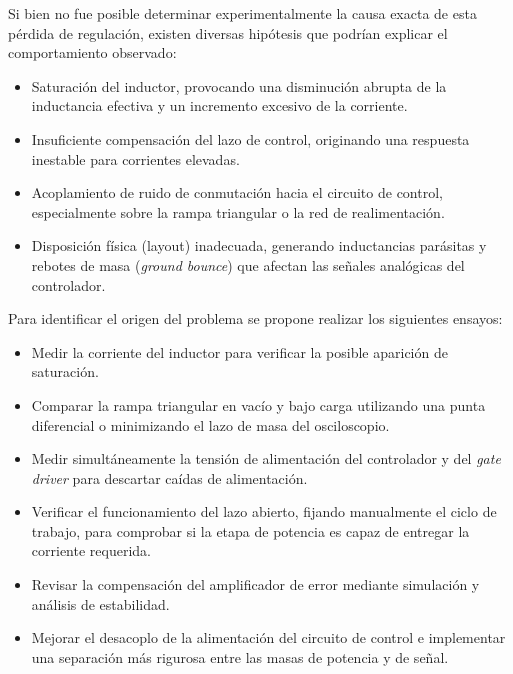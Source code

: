 \documentclass[]{article}
\begin{document}
	Si bien no fue posible determinar experimentalmente la causa exacta de esta pérdida de regulación, existen diversas hipótesis que podrían explicar el comportamiento observado:
	
	\begin{itemize}
		\item Saturación del inductor, provocando una disminución abrupta de la inductancia efectiva y un incremento excesivo de la corriente.
		
		\item Insuficiente compensación del lazo de control, originando una respuesta inestable para corrientes elevadas.
		
		\item Acoplamiento de ruido de conmutación hacia el circuito de control, especialmente sobre la rampa triangular o la red de realimentación.
		
		\item Disposición física (layout) inadecuada, generando inductancias parásitas y rebotes de masa (\textit{ground bounce}) que afectan las señales analógicas del controlador.
		
		
	\end{itemize}
	
	Para identificar el origen del problema se propone realizar los siguientes ensayos:
	
	\begin{itemize}
		\item Medir la corriente del inductor para verificar la posible aparición de saturación.
		\item Comparar la rampa triangular en vacío y bajo carga utilizando una punta diferencial o minimizando el lazo de masa del osciloscopio.
		\item Medir simultáneamente la tensión de alimentación del controlador y del \textit{gate driver} para descartar caídas de alimentación.
		\item Verificar el funcionamiento del lazo abierto, fijando manualmente el ciclo de trabajo, para comprobar si la etapa de potencia es capaz de entregar la corriente requerida.
		\item Revisar la compensación del amplificador de error mediante simulación y análisis de estabilidad.
		\item Mejorar el desacoplo de la alimentación del circuito de control e implementar una separación más rigurosa entre las masas de potencia y de señal.
	\end{itemize}
	
\end{document}
